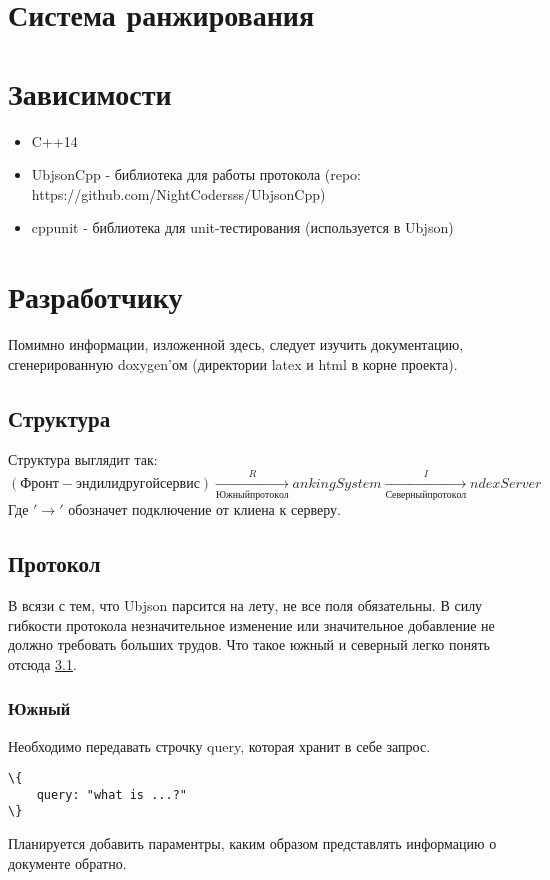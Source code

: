 \documentclass[12pt,a4paper]{article}
\begin{document}
\section{Система ранжирования}



\section{Зависимости}

\begin{itemize}
    \item C++14
    \item UbjsonCpp  - библиотека для работы протокола (repo: https://github.com/NightCodersss/UbjsonCpp)
    \item cppunit - библиотека для unit-тестирования (используется в Ubjson)
\end{itemize}

\section{Разработчику}
Помимно информации, изложенной здесь, следует изучить документацию, сгенерированную doxygen'ом (директории latex и html в корне проекта).

\subsection{Структура}
\label{subsec:generalStructure}
Структура выглядит так:
$(Фронт-энд или другой сервис) \xrightarrow[Южный протокол] Ranking System \xrightarrow[Северный протокол] IndexServer$
Где $'\rightarrow'$ обозначет подключение от клиена к серверу.

\subsection{Протокол}
В всязи с тем, что Ubjson парсится на лету, не все поля обязательны. 
В силу гибкости протокола незначительное изменение или значительное добавление не должно требовать больших трудов.
Что такое южный и северный легко понять отсюда \ref{subsec:generalStructure}.

\subsubsection{Южный}
Необходимо передавать строчку query, которая хранит в себе запрос.
\begin{verbatim}
\{
	query: "what is ...?"
\}
\end{verbatim}
Планируется добавить параментры, каким образом представлять информацию о документе обратно.
\end{document}
